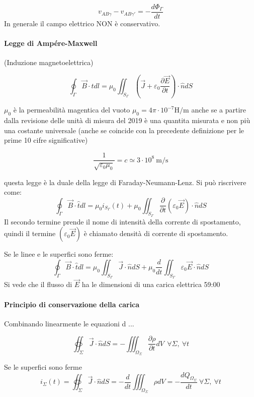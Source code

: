 $$
v_{AB\gamma} - v_{AB\gamma'} = -\frac{d\Phi_\Gamma}{dt}
$$
In generale il campo elettrico NON è conservativo.

\paragraph{Legge di Ampére-Maxwell} (Induzione magnetoelettrica)

\begin{equation}
\oint_\Gamma \vec{B}\cdot\hat{t} dl = \mu_0 \iint_{S_\Gamma} \left(\vec{J} + \varepsilon_0\frac{\partial\vec{E}}{\partial t}\right)\cdot \hat{n} dS
\end{equation}

$\mu_0$ è la permeabilità magentica del vuoto $\mu_0 = 4\pi\cdot10^{-7}\si{\henry\per\meter} $
anche se a partire dalla revisione delle unità di misura del 2019 è una quantita misurata e non più una costante universale (anche se coincide con la precedente definizione per le prime 10 cifre significative)

$$
\frac{1}{\sqrt{\varepsilon_0\mu_0}} = c \simeq 3\cdot10^{8}\ \si{\meter\per\second}
$$

questa legge è la duale della legge di Faraday-Neumann-Lenz. Si può riscrivere come:
$$
\oint_\Gamma\vec{B}\cdot\hat{t}dl = \mu_0 i_{S_\Gamma}(t) + \mu_0 \iint_{S_\Gamma} \frac{\partial}{\partial t}(\varepsilon_0 \vec{E})\cdot\hat{n}dS
$$
Il secondo termine prende il nome di intensità della corrente di spostamento, quindi il termine
$\left(\varepsilon_0 \vec{E}\right)$ è chiamato densità di corrente di spostamento.

Se le linee e le superfici sono ferme:
$$
\oint_\Gamma\vec{B}\cdot\hat{t}dl = \mu_0\iint_{S_\Gamma}\vec{J}\cdot\hat{n}dS + 
\mu_0\frac{d}{dt}\iint_{S_\Gamma} \varepsilon_0 \vec{E}\cdot\hat{n} dS
$$
Si vede che il flusso di $\vec{E}$ ha le dimensioni di una carica elettrica 59:00

\paragraph{Principio di conservazione della carica}
Combinando linearmente le equazioni d ...

\begin{equation}
\oiint_\Sigma\vec{J}\cdot\hat{n}dS = - \iiint_{\Omega_\Sigma}\frac{\partial \rho}{\partial t} dV
\ \ \forall\Sigma,\ \forall t
\end{equation}

Se le superfici sono ferme
$$
i_{\Sigma}(t) = \oiint_\Sigma\vec{J}\cdot\hat{n}dS = -\frac{d}{dt} \iiint_{\Omega_\Sigma} \rho dV = -\frac{dQ_{\Omega_\Sigma}}{dt}\ \forall\Sigma,\ \forall t
$$

